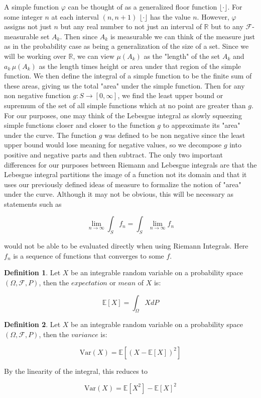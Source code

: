 \documentclass[12pt]{article}
\theoremstyle{definition}
\newtheorem{definition}{Definition}[section]
\theoremstyle{plain}
\theoremstyle{remark}
\begin{document}
A simple function $\varphi$ can be thought of as a generalized floor function $\lfloor \cdot \rfloor$.  For some integer $n$ at each interval $(n,n+1)$  $\lfloor \cdot \rfloor$ has the value $n$.  However, $\varphi$ assigns not just $n$ but any real number to not just an interval of $\mathbb{R}$ but to any $\mathcal{F}$-measurable set $A_k$.  Then since $A_k$ is measurable we can think of the measure just as in the probability case as being a generalization of the size of a set.  Since we will be working over $\mathbb{R}$, we can view $\mu(A_k)$ as the "length" of the set $A_k$ and $a_k \, \mu(A_k)$ as the length times height or area under that region of the simple function.  We then define the integral of a simple function to be the finite sum of these areas, giving us the total "area" under the simple function.  Then for any non negative function $g: S \to [0,\infty]$, we find the least upper bound or supremum of the set of all simple functions which at no point are greater than $g$.  For our purposes, one may think of the Lebesgue integral as slowly squeezing simple functions closer and closer to the function $g$ to approximate its "area" under the curve.  The function $g$ was defined to be non negative since the least upper bound would lose meaning for negative values, so we decompose $g$ into positive and negative parts and then subtract.  The only two important differences for our purposes between Riemann and Lebesgue integrals are that the Lebesgue integral partitions the image of a function not its domain and that it uses our previously defined ideas of measure to formalize the notion of "area" under the curve.  Although it may not be obvious, this will be necessary as statements such as

\[
\lim_{n \to \infty} \int_S f_n = \int_S \lim_{n \to \infty} f_n
\]

would not be able to be evaluated directly when using Riemann Integrals.  Here $f_n$ is a sequence of functions that converges to some $f$.

\begin{definition}
Let $X$ be an integrable random variable on a probability space $(\Omega, \mathcal{F}, P)$, then the $\textit{expectation}$ or $\textit{mean}$ of $X$ is:

\[
\mathbb{E}[X] = \int_{\Omega} X dP
\]

\end{definition}

\begin{definition}
Let $X$ be an integrable random variable on a probability space $(\Omega, \mathcal{F}, P)$, then the $\textit{variance}$ is:

\[
\text{Var}(X) = \mathbb{E}[(X-\mathbb{E}[X])^2]
\]

By the linearity of the integral, this reduces to

\[
\text{Var}(X) = \mathbb{E}[X^2]-\mathbb{E}[X]^2
\]

\end{definition}
\end{document}
